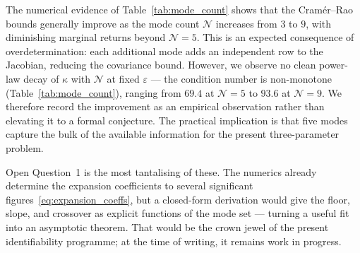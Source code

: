 \begin{remark}
\label{rem:monotone}
The numerical evidence of Table~\ref{tab:mode_count} shows that the
Cram\'er--Rao bounds generally improve as the mode count $\mathcal{N}$
increases from $3$ to $9$, with diminishing marginal returns beyond
$\mathcal{N}=5$.  This is an expected consequence of overdetermination:
each additional mode adds an independent row to the Jacobian, reducing the
covariance bound.  However, we observe no clean power-law decay of $\kappa$
with $\mathcal{N}$ at fixed $\varepsilon$ --- the condition number is
non-monotone (Table~\ref{tab:mode_count}), ranging from $69.4$ at
$\mathcal{N}=5$ to $93.6$ at $\mathcal{N}=9$.  We therefore record the
improvement as an empirical observation rather than elevating it to a formal
conjecture.  The practical implication is that five modes capture the bulk
of the available information for the present three-parameter problem.
\end{remark}

Open Question~1 is the most tantalising of these.  The numerics already
determine the expansion coefficients
to several significant figures~\eqref{eq:expansion_coeffs}, but a
closed-form derivation would give the floor, slope, and crossover as
explicit functions of the mode set --- turning a useful fit into an
asymptotic theorem.  That would be the crown jewel of the present
identifiability programme; at the time of writing, it remains work in
progress.
